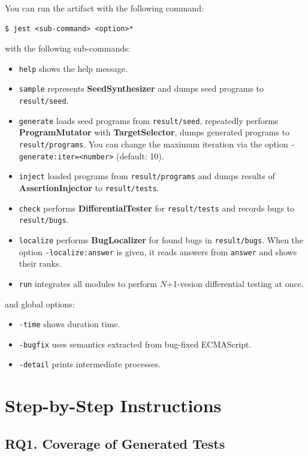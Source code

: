 \documentclass{article}
\begin{document}
You can run the artifact with the following command:
\begin{lstlisting}
$ jest <sub-command> <option>*
\end{lstlisting}
with the following sub-commands:
\begin{itemize}
  \item \texttt{help} shows the help message.
  \item \texttt{sample} represents \textbf{SeedSynthesizer} and dumps seed
    programs to \texttt{result/seed}.
  \item \texttt{generate} loads seed programs from \texttt{result/seed},
    repeatedly performs \textbf{ProgramMutator} with \textbf{TargetSelector},
    dumps generated programs to \texttt{result/programs}. You can change the
    maximum iteration via the option \texttt{-generate:iter=<number>} (default:
    10).
  \item \texttt{inject} loaded programs from \texttt{result/programs} and dumps
    results of \textbf{AssertionInjector} to \texttt{result/tests}.
  \item \texttt{check} performs \textbf{DifferentialTester} for
    \texttt{result/tests} and records bugs to \texttt{result/bugs}.
  \item \texttt{localize} performs \textbf{BugLocalizer} for found bugs in
    \texttt{result/bugs}. When the option \texttt{-localize:answer} is given, it
    reads answers from \texttt{answer} and shows their ranks.
  \item \texttt{run} integrates all modules to perform $N$+1-vesion differential
    testing at once.
\end{itemize}
and global options:
\begin{itemize}
  \item \texttt{-time} shows duration time.
  \item \texttt{-bugfix} uses semantics extracted from bug-fixed ECMAScript.
  \item \texttt{-detail} prints intermediate processes.
\end{itemize}


\section{Step-by-Step Instructions}

\subsection{RQ1. Coverage of Generated Tests}
\end{document}
